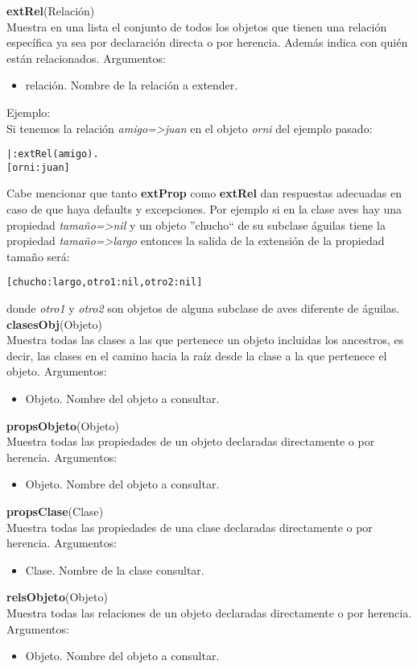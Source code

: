 \documentclass[11pt]{article}
\newcommand{\bt}{\begin{alltt}}
\newcommand{\et}{\end{alltt}}
\newcommand{\comando}[2]{
    \textbf{#1}(#2)\\
}
\newenvironment{args}{
    \newline
    Argumentos:
    \begin{itemize}
}{
    \end{itemize}
    \bigskip
}
\begin{document}
\comando{extRel}{Relación}
Muestra en una lista el conjunto de todos los objetos que tienen una relación específica ya sea
por declaración directa o por herencia. Además indica con quién están relacionados.
\begin{args}
    \item relación. Nombre de la relación a extender.
\end{args}
Ejemplo:\\
Si tenemos la relación \textit{amigo=>juan} en el objeto \textit{orni} del ejemplo pasado:
\bt
|: extRel(amigo).
[orni:juan]
\et

Cabe mencionar que tanto \textbf{extProp} como \textbf{extRel} dan respuestas adecuadas 
en caso de que haya defaults y excepciones. Por ejemplo si en la clase aves hay una propiedad
\textit{tamaño=>nil} y un objeto ''chucho`` de su subclase águilas tiene la propiedad 
\textit{tamaño=>largo} entonces la salida de la extensión de la propiedad tamaño será:
\bt
[chucho:largo,otro1:nil,otro2:nil]
\et
donde \emph{otro1} y \emph{otro2} son objetos de alguna subclase de aves diferente de águilas.\\

\comando{clasesObj}{Objeto}
Muestra todas las clases a las que pertenece un objeto incluidas los ancestros, es decir, las
clases en el camino hacia la raíz desde la clase a la que pertenece el objeto.
\begin{args}
    \item Objeto. Nombre del objeto a consultar.
\end{args}

\comando{propsObjeto}{Objeto}
Muestra todas las propiedades de un objeto declaradas directamente o por herencia.
\begin{args}
    \item Objeto. Nombre del objeto a consultar.
\end{args}

\comando{propsClase}{Clase}
Muestra todas las propiedades de una clase declaradas directamente o por herencia.
\begin{args}
    \item Clase. Nombre de la clase consultar.
\end{args}


\comando{relsObjeto}{Objeto}
Muestra todas las relaciones de un objeto declaradas directamente o por herencia.
\begin{args}
    \item Objeto. Nombre del objeto a consultar.
\end{args}
\end{document}
